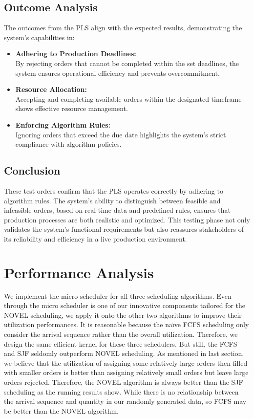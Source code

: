 \documentclass[conference]{IEEEtran}
\begin{document}
\subsection{Outcome Analysis}
The outcomes from the PLS align with the expected results, demonstrating the system's capabilities in:
\begin{itemize}
    \item \textbf{Adhering to Production Deadlines: } \\
    By rejecting orders that cannot be completed within the set deadlines, the system ensures operational efficiency and prevents overcommitment.
    \item \textbf{Resource Allocation: } \\
    Accepting and completing available orders within the designated timeframe shows effective resource management.
    \item \textbf{Enforcing Algorithm Rules: } \\
    Ignoring orders that exceed the due date highlights the system's strict compliance with algorithm policies.
\end{itemize}

\subsection{Conclusion}
These test orders confirm that the PLS operates correctly by adhering to algorithm rules. The system's ability to distinguish between feasible and infeasible orders, based on real-time data and predefined rules, ensures that production processes are both realistic and optimized. This testing phase not only validates the system's functional requirements but also reassures stakeholders of its reliability and efficiency in a live production environment.


\section{\textbf{Performance Analysis}}
We implement the micro scheduler for all three scheduling algorithms. Even through the micro scheduler is one of our innovative components tailored for the NOVEL scheduling, we apply it onto the other two algorithms to improve their utilization performances. It is reasonable because the naïve FCFS scheduling only consider the arrival sequence rather than the overall utilization. Therefore, we design the same efficient kernel for these three schedulers.
But still, the FCFS and SJF seldomly outperform NOVEL scheduling. As mentioned in last section, we believe that the utilization of assigning some relatively large orders then filled with smaller orders is better than assigning relatively small orders but leave large orders rejected. Therefore, the NOVEL algorithm is always better than the SJF scheduling as the running results show. While there is no relationship between the arrival sequence and quantity in our randomly generated data, so FCFS may be better than the NOVEL algorithm.
\end{document}
